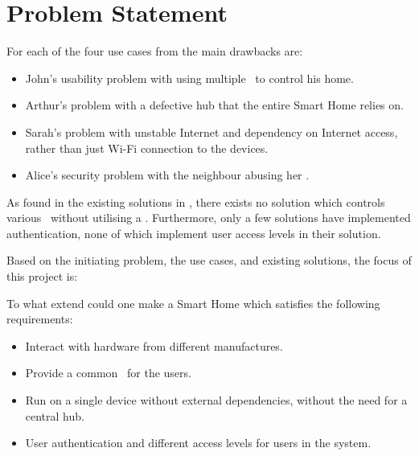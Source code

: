 \section{Problem Statement} \label{sec:problem-statement}

For each of the four use cases from  the main drawbacks are: 
\begin{itemize}
\item John's usability problem with using multiple \phones~to control his home.
\item Arthur's problem with a defective hub that the entire Smart Home relies on.
\item Sarah's problem with unstable Internet and dependency on Internet access, rather than just Wi-Fi connection to the devices.
\item Alice's security problem with the neighbour abusing her \sdevs.
\end{itemize}

As found in the existing solutions in , there exists no solution which controls various \sdevs~without utilising a \hub.
Furthermore, only a few solutions have implemented authentication, none of which implement user access levels in their solution.

Based on the initiating problem, the use cases, and existing solutions, the focus of this project is:
\begin{changemargin}{1cm}{1cm} 
To what extend could one make a Smart Home which satisfies the following requirements:
\begin{itemize}
\item Interact with hardware from different manufactures.
\item Provide a common \phone~for the users.
\item Run on a single device without external dependencies, without the need for a central hub. 
\item User authentication and different access levels for users in the system.
\end{itemize}
\end{changemargin} 




